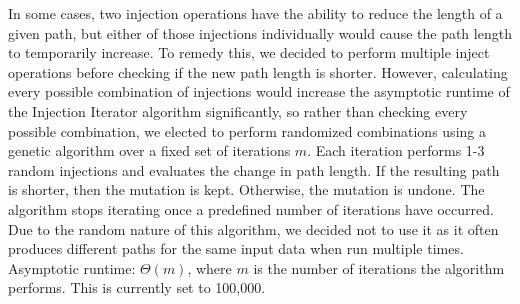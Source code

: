 \documentclass{article}
\begin{document}
In some cases, two injection operations have the ability to reduce the length
of a given path, but either of those injections individually would cause the
path length to temporarily increase. To remedy this, we decided to perform
multiple inject operations before checking if the new path length is shorter.
However, calculating every possible combination of injections would increase
the asymptotic runtime of the Injection Iterator algorithm significantly, so
rather than checking every possible combination, we elected to perform
randomized combinations using a genetic algorithm over a fixed set of
iterations $m$. Each iteration performs 1-3 random injections and evaluates the
change in path length. If the resulting path is shorter, then the mutation is
kept. Otherwise, the mutation is undone. The algorithm stops iterating once a
predefined number of iterations have occurred.  Due to the random nature of
this algorithm, we decided not to use it as it often produces different paths
for the same input data when run multiple times.\\Asymptotic runtime: $\Theta
(m)$, where $m$ is the number of iterations the algorithm performs. This is
currently set to 100,000.
\end{document}
